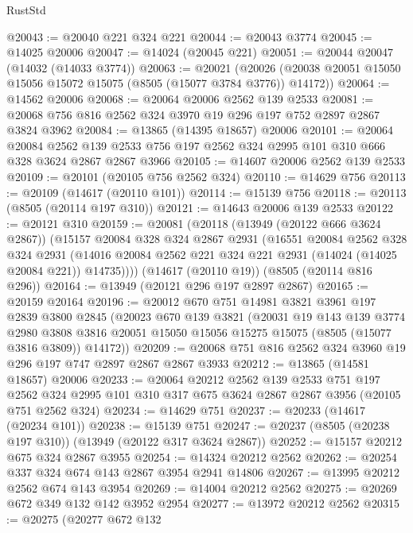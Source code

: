 \begin{lexlean}{RustStd}
\begin{coremodule}
@20043 := @20040 @221 @324 @221
@20044 := @20043 @3774
@20045 := @14025 @20006
@20047 := @14024 (@20045 @221)
@20051 := @20044 @20047 (@14032 (@14033 @3774))
@20063 := @20021
    (@20026 (@20038 @20051 @15050 @15056 @15072 @15075 (@8505 (@15077 @3784 @3776)) @14172))
@20064 := @14562 @20006
@20068 := @20064 @20006 @2562 @139 @2533
@20081 := @20068 @756 @816 @2562 @324 @3970 @19 @296 @197 @752 @2897 @2867 @3824 @3962
@20084 := @13865 (@14395 @18657) @20006
@20101 := @20064
    @20084
    @2562
    @139
    @2533
    @756
    @197
    @2562
    @324
    @2995
    @101
    @310
    @666
    @328
    @3624
    @2867
    @2867
    @3966
@20105 := @14607 @20006 @2562 @139 @2533
@20109 := @20101 (@20105 @756 @2562 @324)
@20110 := @14629 @756
@20113 := @20109 (@14617 (@20110 @101))
@20114 := @15139 @756
@20118 := @20113 (@8505 (@20114 @197 @310))
@20121 := @14643 @20006 @139 @2533
@20122 := @20121 @310
@20159 := @20081
    (@20118
      (@13949 (@20122 @666 @3624 @2867))
      (@15157
        @20084
        @328
        @324
        @2867
        @2931
        (@16551
          @20084
          @2562
          @328
          @324
          @2931
          (@14016 @20084 @2562 @221 @324 @221 @2931 (@14024 (@14025 @20084 @221)) @14735))))
    (@14617 (@20110 @19))
    (@8505 (@20114 @816 @296))
@20164 := @13949 (@20121 @296 @197 @2897 @2867)
@20165 := @20159 @20164
@20196 := @20012
    @670
    @751
    @14981
    @3821
    @3961
    @197
    @2839
    @3800
    @2845
    (@20023
      @670
      @139
      @3821
      (@20031
        @19
        @143
        @139
        @3774
        @2980
        @3808
        @3816
        @20051
        @15050
        @15056
        @15275
        @15075
        (@8505 (@15077 @3816 @3809))
        @14172))
@20209 := @20068 @751 @816 @2562 @324 @3960 @19 @296 @197 @747 @2897 @2867 @2867 @3933
@20212 := @13865 (@14581 @18657) @20006
@20233 := @20064
    @20212
    @2562
    @139
    @2533
    @751
    @197
    @2562
    @324
    @2995
    @101
    @310
    @317
    @675
    @3624
    @2867
    @2867
    @3956
    (@20105 @751 @2562 @324)
@20234 := @14629 @751
@20237 := @20233 (@14617 (@20234 @101))
@20238 := @15139 @751
@20247 := @20237 (@8505 (@20238 @197 @310)) (@13949 (@20122 @317 @3624 @2867))
@20252 := @15157 @20212 @675 @324 @2867 @3955
@20254 := @14324 @20212 @2562
@20262 := @20254 @337 @324 @674 @143 @2867 @3954 @2941 @14806
@20267 := @13995 @20212 @2562 @674 @143 @3954
@20269 := @14004 @20212 @2562
@20275 := @20269 @672 @349 @132 @142 @3952 @2954
@20277 := @13972 @20212 @2562
@20315 := @20275
    (@20277
      @672
      @132

\end{coremodule}
\end{lexlean}
